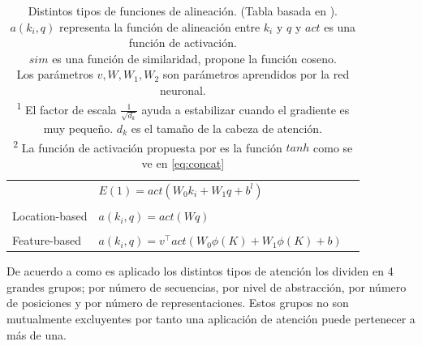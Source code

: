 \begin{table}[ht!]
\begin{center}
\begin{tabular}{@{}lll@{}}
    & $E(1) = act(W_0k_i + W_1q + b^l)$ &  \\ \\
Location-based & $a(k_i, q) = act(W q)$ & \citeauthor*{DBLP:journals/corr/LuongPM15} \\ \\
Feature-based & $a(k_i, q) = v^\top act(W_0 \phi(K) + W_1 \phi(K) + b)$ & \citeauthor*{DBLP:journals/corr/abs-1810-10126} \\
\bottomrule
\end{tabular}
\end{center}
\caption{Distintos tipos de funciones de alineación. (Tabla basada en \cite{DBLP:journals/corr/abs-1904-02874} \cite{weng2018attention}). \\
$a(k_i, q)$ representa la función de alineación entre $k_i$ y $q$ y $act$ es una función de activación. \\
$sim$ es una función de similaridad, \citeauthor*{DBLP:journals/corr/GravesWD14} propone la función coseno.\\
Los parámetros $v, W, W_1, W_2$ son parámetros aprendidos por la red neuronal.\\
\textsuperscript{1} El factor de escala $\frac{1}{\sqrt{d_k}}$ ayuda a estabilizar cuando el
gradiente es muy pequeño. $d_k$ es el tamaño de la cabeza de atención.\\
\textsuperscript{2} La función de activación propuesta por \citeauthor*{bahdanau2016neural} es la función $tanh$ como se ve en \ref{eq:concat} \\
\label{Tab:att}}
\end{table}

De acuerdo a como es aplicado los distintos tipos de atención \citeauthor*{DBLP:journals/corr/abs-1904-02874}
los dividen en 4 grandes grupos; por número de secuencias, por nivel de abstracción, por número de
posiciones y por número de representaciones. Estos grupos no son mutualmente excluyentes por tanto
una aplicación de atención puede pertenecer a más de una.

